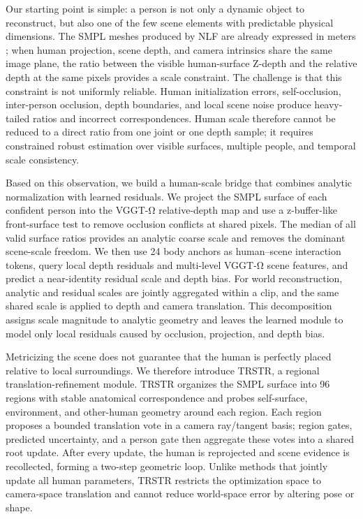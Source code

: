 \documentclass{article}
\begin{document}
Our starting point is simple: a person is not only a dynamic object to reconstruct, but also one of the few scene elements with predictable physical dimensions. The SMPL meshes produced by NLF are already expressed in meters \citep{sarandi2024nlf,loper2023smpl}; when human projection, scene depth, and camera intrinsics share the same image plane, the ratio between the visible human-surface Z-depth and the relative depth at the same pixels provides a scale constraint. The challenge is that this constraint is not uniformly reliable. Human initialization errors, self-occlusion, inter-person occlusion, depth boundaries, and local scene noise produce heavy-tailed ratios and incorrect correspondences. Human scale therefore cannot be reduced to a direct ratio from one joint or one depth sample; it requires constrained robust estimation over visible surfaces, multiple people, and temporal scale consistency.

Based on this observation, we build a human-scale bridge that combines analytic normalization with learned residuals. We project the SMPL surface of each confident person into the VGGT-Ω relative-depth map and use a z-buffer-like front-surface test to remove occlusion conflicts at shared pixels. The median of all valid surface ratios provides an analytic coarse scale and removes the dominant scene-scale freedom. We then use 24 body anchors as human--scene interaction tokens, query local depth residuals and multi-level VGGT-Ω scene features, and predict a near-identity residual scale and depth bias. For world reconstruction, analytic and residual scales are jointly aggregated within a clip, and the same shared scale is applied to depth and camera translation. This decomposition assigns scale magnitude to analytic geometry and leaves the learned module to model only local residuals caused by occlusion, projection, and depth bias.

Metricizing the scene does not guarantee that the human is perfectly placed relative to local surroundings. We therefore introduce TRSTR, a regional translation-refinement module. TRSTR organizes the SMPL surface into 96 regions with stable anatomical correspondence and probes self-surface, environment, and other-human geometry around each region. Each region proposes a bounded translation vote in a camera ray/tangent basis; region gates, predicted uncertainty, and a person gate then aggregate these votes into a shared root update. After every update, the human is reprojected and scene evidence is recollected, forming a two-step geometric loop. Unlike methods that jointly update all human parameters, TRSTR restricts the optimization space to camera-space translation and cannot reduce world-space error by altering pose or shape.
\end{document}
